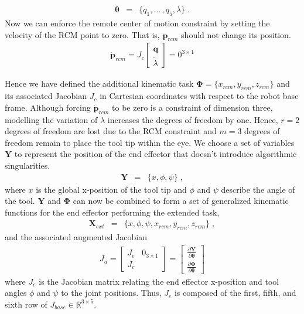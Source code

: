 \begin{eqnarray}
	\bm{\dot{\theta}} & = & \{ q_1,... \, , q_5, \lambda \} \; .
\end{eqnarray}
Now we can enforce the remote center of motion constraint by setting the velocity of the RCM point to zero. That is, $\bm{p}_{rcm}$ should not change its position.
\begin{eqnarray}
	\bm{\dot{p}}_{rcm}	= J_{c}
			\begin{bmatrix}
				\bm{\dot{q}} \\[2pt]
				\dot{\lambda}
			\end{bmatrix}
					= 0^{3\times 1}
\end{eqnarray}

Hence we have defined the additional kinematic task $\bm{\Phi} = \{x_{rcm}, y_{rcm}, z_{rcm}\}$ and its associated Jacobian $J_c$ in Cartesian coordinates with respect to the robot base frame. 
Although forcing $\bm{\dot{p}}_{rcm}$ to be zero is a constraint of dimension three, modelling the variation of $\lambda$ increases the degrees of freedom by one. Hence, $r=2$ degrees of freedom are lost due to the RCM constraint and $m=3$ degrees of freedom remain to place the tool tip within the eye. 
We choose a set of variables $\bm{Y}$ to represent the position of the end effector that doesn't introduce algorithmic singularities. 
\begin{eqnarray}
	\bm{Y} &=&	\{ x, \phi, \psi\} \; ,
\end{eqnarray}
where $x$ is the global x-position of the tool tip and $\phi$ and $\psi$ describe the angle of the tool.
$\bm{Y}$ and $\bm{\Phi}$ can now be combined to form a set of generalized kinematic functions for the end effector performing the extended task,
\begin{eqnarray}
	\bm{X}_{ext} &=& \{x, \phi, \psi, x_{rcm}, y_{rcm}, z_{rcm} \} \; ,
\end{eqnarray}
and the associated augmented Jacobian
\begin{eqnarray}
	J_{a} =
		\begin{bmatrix}
			J_e \hspace{10pt} 0_{3 \times 1} \\[3pt]
			J_c
		\end{bmatrix}	
		=
		\begin{bmatrix}
			\frac{\partial \bm{Y}}
				{\partial \bm{\theta}} \\[3pt]
			\frac{\partial \bm{\Phi}}
				{\partial \bm{\theta}}
		\end{bmatrix}
\end{eqnarray}
where $J_e$ is the Jacobian matrix relating the end effector x-position and tool angles $\phi $ and $\psi$ to the joint positions. Thus, $J_e$ is composed of the first, fifth, and sixth row of $J_{base} \in \mathbb{R}^{3\times5}$.

